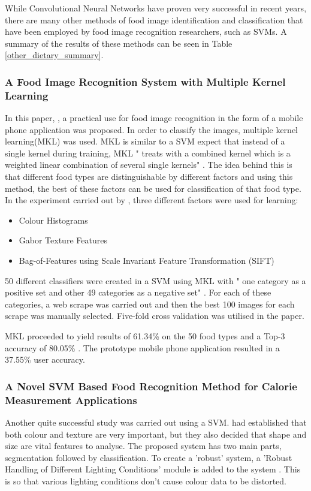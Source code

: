While Convolutional Neural Networks have proven very successful in recent years, there are many other methods of food image identification and classification that have been employed by food image recognition researchers, such as SVMs.
A summary of the results of these methods can be seen in Table \ref{other_dietary_summary}.

\subsubsection*{A Food Image Recognition System with Multiple Kernel Learning}
In this paper, \parencite{kernelLearning}, a practical use for food image recognition in the form of a mobile phone application was proposed.
In order to classify the images, multiple kernel learning(MKL) was used.
MKL is similar to a SVM expect that instead of a single kernel during training, MKL " treats with a combined kernel which is a weighted linear combination of several single kernels" \parencite{kernelLearning}.
The idea behind this is that different food types are distinguishable by different factors and using this method, the best of these factors can be used for classification of that food type.
In the experiment carried out by \parencite{kernelLearning}, three different factors were used for learning:
\begin{itemize}
	\item{Colour Histograms}
	\item{Gabor Texture Features}
	\item{Bag-of-Features using Scale Invariant Feature Transformation (SIFT)}
\end{itemize}

50 different classifiers were created in a SVM using MKL with " one category as a positive set and other 49 categories as a negative set" \parencite{kernelLearning}.
For each of these categories, a web scrape was carried out and then the best 100 images for each scrape was manually selected. Five-fold cross validation was utilised in the paper.

MKL proceeded to yield results of 61.34\% on the 50 food types and a Top-3 accuracy of 80.05\% \parencite{kernelLearning}.
The prototype mobile phone application resulted in a 37.55\% user accuracy.

\subsubsection*{A Novel SVM Based Food Recognition Method for Calorie Measurement Applications}
Another quite successful study was carried out using a SVM.
\parencite{novelSVM} had established that both colour and texture are very important, but they also decided that shape and size are vital features to analyse.
The proposed system has two main parts, segmentation followed by classification.
To create a 'robust' system, a 'Robust Handling of Different Lighting Conditions' module is added to the system \parencite{novelSVM}.
This is so that various lighting conditions don't cause colour data to be distorted. 

